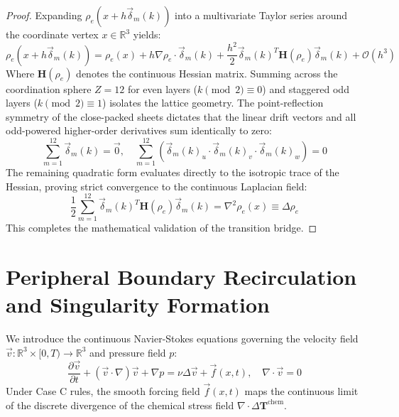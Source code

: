 \documentclass[12pt,fleqn]{article}
\begin{document}
\begin{proof}
Expanding $\rho_e(x + h \vec{\delta}_m(k))$ into a multivariate Taylor series around the coordinate vertex $x \in \mathbb{R}^3$ yields:
\begin{equation}
\rho_e(x + h \vec{\delta}_m(k)) = \rho_e(x) + h \nabla \rho_e \cdot \vec{\delta}_m(k) + \frac{h^2}{2} \vec{\delta}_m(k)^T \mathbf{H}(\rho_e) \vec{\delta}_m(k) + \mathcal{O}(h^3)
\end{equation}
Where $\mathbf{H}(\rho_e)$ denotes the continuous Hessian matrix. Summing across the coordination sphere $Z=12$ for even layers ($k \pmod 2 \equiv 0$) and staggered odd layers ($k \pmod 2 \equiv 1$) isolates the lattice geometry. The point-reflection symmetry of the close-packed sheets dictates that the linear drift vectors and all odd-powered higher-order derivatives sum identically to zero:
\begin{equation}
\sum_{m=1}^{12} \vec{\delta}_m(k) = \vec{0}, \quad \sum_{m=1}^{12} (\vec{\delta}_m(k)_u \cdot \vec{\delta}_m(k)_v \cdot \vec{\delta}_m(k)_w) = 0
\end{equation}
The remaining quadratic form evaluates directly to the isotropic trace of the Hessian, proving strict convergence to the continuous Laplacian field:
\begin{equation}
\frac{1}{2} \sum_{m=1}^{12} \vec{\delta}_m(k)^T \mathbf{H}(\rho_e) \vec{\delta}_m(k) = \nabla^2 \rho_e(x) \equiv \Delta \rho_e
\end{equation}
This completes the mathematical validation of the transition bridge.
\end{proof}
\section{Peripheral Boundary Recirculation and Singularity Formation}
We introduce the continuous Navier-Stokes equations governing the velocity field $\vec{v}: \mathbb{R}^3 \times [0, T) \to \mathbb{R}^3$ and pressure field $p$:
\begin{equation}\label{eq:NS_core}
\frac{\partial \vec{v}}{\partial t} + (\vec{v} \cdot \nabla)\vec{v} + \nabla p = \nu \Delta \vec{v} + \vec{f}(x,t), \quad \nabla \cdot \vec{v} = 0
\end{equation}
Under Case C rules, the smooth forcing field $\vec{f}(x,t)$ maps the continuous limit of the discrete divergence of the chemical stress field $\nabla \cdot \Delta \mathbf{T}^{\text{chem}}$.
\end{document}
